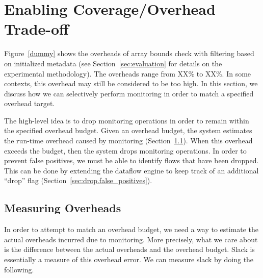 \section{Enabling Coverage/Overhead Trade-off}
\label{sec:drop}

Figure~\ref{dummy} shows the overheads of array bounds check with filtering
based on initialized metadata (see Section~\ref{sec:evaluation} for details on
the experimental methodology). The overheads range from XX\% to XX\%. In some
contexts, this overhead may still be considered to be too high. In this
section, we discuss how we can selectively perform monitoring in order to
match a specified overhead target.

The high-level idea is to drop monitoring operations in order to remain within
the specified overhead budget. Given an overhead budget, the system estimates
the run-time overhead caused by monitoring (Section~\ref{sec:drop.slack}). When
this overhead exceeds the budget, then the system drops monitoring operations.
In order to prevent false positives, we must be able to identify flows that
have been dropped. This can be done by extending the dataflow engine to keep
track of an additional ``drop'' flag (Section~\ref{sec:drop.false_positives}). 

\subsection{Measuring Overheads}
\label{sec:drop.slack}

In order to attempt to match an overhead budget, we need a way to estimate the
actual overheads incurred due to monitoring. More precisely, what we care about
is the difference between the actual overheads and the overhead budget.
Slack is essentially a measure of this overhead error. We can measure slack by
doing the following. 

